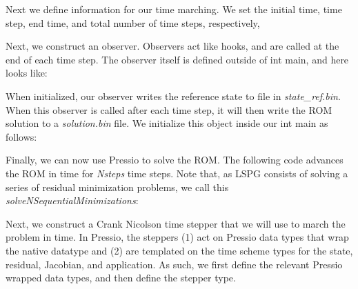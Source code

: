 Next we define information for our time marching. We set the initial time, time step, end time, and total number of time steps, respectively, 
\begin{DoxyCode}{0}
\end{DoxyCode}


Next, we construct an observer. Observers act like hooks, and are called at the end of each time step. The observer itself is defined outside of int main, and here looks like\+: 
\begin{DoxyCode}{0}
\end{DoxyCode}


When initialized, our observer writes the reference state to file in {\itshape state\+\_\+ref.\+bin}. When this observer is called after each time step, it will then write the R\+OM solution to a {\itshape solution.\+bin} file. We initialize this object inside our int main as follows\+:


\begin{DoxyCode}{0}
\end{DoxyCode}


Finally, we can now use Pressio to solve the R\+OM. The following code advances the R\+OM in time for {\itshape Nsteps} time steps. Note that, as L\+S\+PG consists of solving a series of residual minimization problems, we call this {\itshape solve\+N\+Sequential\+Minimizations}\+: 
\begin{DoxyCode}{0}
\end{DoxyCode}


Next, we construct a Crank Nicolson time stepper that we will use to march the problem in time. In Pressio, the steppers (1) act on Pressio data types that wrap the native datatype and (2) are templated on the time scheme types for the state, residual, Jacobian, and application. As such, we first define the relevant Pressio wrapped data types, and then define the stepper type. 
\begin{DoxyCode}{0}
\end{DoxyCode}


